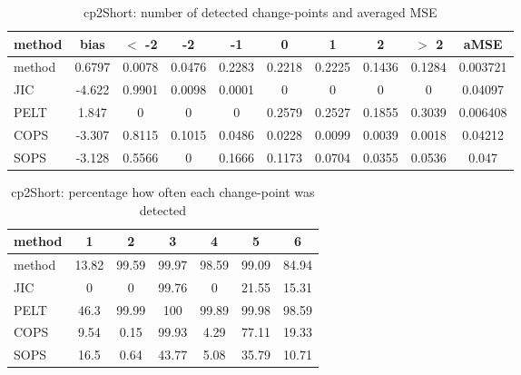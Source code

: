 \begin{table}[ht]
\centering
\begin{tabular}{l|c|ccccccc|c}
  \hline
method & bias & $<$ -2 & -2 & -1 & 0 & 1 & 2 & $>$ 2 & aMSE \\ 
  \hline
method & 0.6797 & 0.0078 & 0.0476 & 0.2283 & 0.2218 & 0.2225 & 0.1436 & 0.1284 & 0.003721 \\ 
  JIC & -4.622 & 0.9901 & 0.0098 & 0.0001 &     0 &     0 &     0 &     0 & 0.04097 \\ 
  PELT & 1.847 &     0 &     0 &     0 & 0.2579 & 0.2527 & 0.1855 & 0.3039 & 0.006408 \\ 
  COPS & -3.307 & 0.8115 & 0.1015 & 0.0486 & 0.0228 & 0.0099 & 0.0039 & 0.0018 & 0.04212 \\ 
  SOPS & -3.128 & 0.5566 &     0 & 0.1666 & 0.1173 & 0.0704 & 0.0355 & 0.0536 & 0.047 \\ 
   \hline
\end{tabular}
\caption{cp2Short: number of detected change-points and averaged MSE} 
\label{tab:cp2ShortNjumps}
\end{table}
\begin{table}[ht]
\centering
\begin{tabular}{l|cccccc}
  \hline
method & 1 & 2 & 3 & 4 & 5 & 6 \\ 
  \hline
method &  13.82 &  99.59 &  99.97 &  98.59 &  99.09 &  84.94 \\ 
  JIC &      0 &      0 &  99.76 &      0 &  21.55 &  15.31 \\ 
  PELT &   46.3 &  99.99 &    100 &  99.89 &  99.98 &  98.59 \\ 
  COPS &   9.54 &   0.15 &  99.93 &   4.29 &  77.11 &  19.33 \\ 
  SOPS &   16.5 &   0.64 &  43.77 &   5.08 &  35.79 &  10.71 \\ 
   \hline
\end{tabular}
\caption{cp2Short: percentage how often each change-point was detected} 
\label{tab:cp2ShortDetections}
\end{table}
